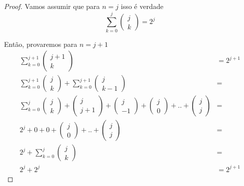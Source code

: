 \documentclass{article}
\begin{document}
\begin{proof}
Vamos assumir que para $n = j$ isso é verdade
\begin{equation}
	\sum\limits_{k=0}^{j}\left(\begin{array}{c} j \\ k \end{array} \right) = 2^j
\end{equation}

Então, provaremos para $n = j + 1$
\begin{equation}
	\begin{split}
	\sum\limits_{k=0}^{j+1}\left(\begin{array}{c} j+1 \\ k \end{array} \right) & = 2^{j+1}\\
	\sum\limits_{k=0}^{j+1}\left(\begin{array}{c} j \\ k \end{array} \right) + \sum\limits_{k=0}^{j+1}\left(\begin{array}{c} j \\ k-1 \end{array} \right) & = \\
	\sum\limits_{k=0}^{j}\left(\begin{array}{c} j \\ k \end{array} \right) + \left(\begin{array}{c} j \\ j+1 \end{array} \right) + \left(\begin{array}{c} j \\ -1 \end{array} \right) + \left(\begin{array}{c} j \\ 0 \end{array} \right) + .. + \left(\begin{array}{c} j \\ j \end{array} \right)& = \\
	2^j + 0 + 0 + \left(\begin{array}{c} j \\ 0 \end{array} \right) + .. + \left(\begin{array}{c} j \\ j \end{array} \right) & =  \\
	2^j + \sum\limits_{k=0}^{j}\left(\begin{array}{c} j \\ k \end{array} \right) & = \\
	2^j + 2^j & = 2^{j+1}
	\end{split}
\end{equation}
\end{proof}
\end{document}

